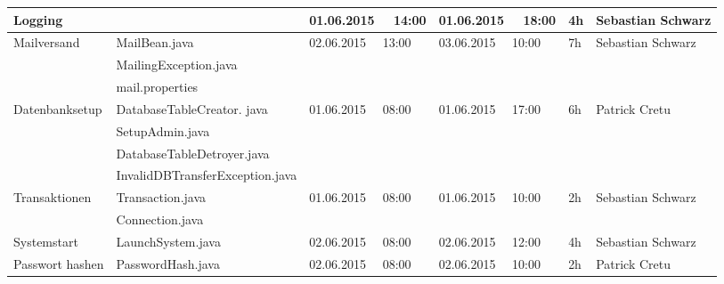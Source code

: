 \begin{landscape}
\begin{tabular}{|p{6cm} |p{6cm}|p{3.2cm}|p{3.2cm}|p{2cm}|p{3.5cm}|}
	\hline  Logging              &                                            & 01.06.2015 \ \ 14:00       & 01.06.2015  \ \  18:00      &  4h                & Sebastian Schwarz\\ 
	\hline  Mailversand          & MailBean.java                              & 02.06.2015 \ \ 13:00       & 03.06.2015  \ \  10:00      &  7h                & Sebastian Schwarz\\ 	
	& MailingException.java                      &                            &                            &                                                  &\\
	& mail.properties                            &                            &                            &                                                  &\\
	\hline Datenbanksetup        & DatabaseTableCreator. java                 & 01.06.2015 \ \ 08:00       & 01.06.2015  \ \  17:00      &  6h                & Patrick Cretu\\
	& SetupAdmin.java                            &                            &                            &                                                  &\\
    & DatabaseTableDetroyer.java                 &                            &                            &                                                  &\\
	& InvalidDBTransferException.java            &                            &                            &                                                  &\\
	\hline Transaktionen         & Transaction.java                           & 01.06.2015 \ \ 08:00       & 01.06.2015 \ \ 10:00        & 2h                 & Sebastian Schwarz\\  
	& Connection.java                            &                            &                            &                                                  &\\  
	\hline Systemstart           & LaunchSystem.java                          & 02.06.2015 \ \ 08:00       & 02.06.2015 \ \ 12:00        & 4h                 & Sebastian Schwarz\\
	\hline Passwort hashen       & PasswordHash.java                          & 02.06.2015 \ \ 08:00       & 02.06.2015 \ \ 10:00        & 2h                 & Patrick Cretu\\       	   
	\hline 
\end{tabular} \ \\
\ \\


\end{landscape}
